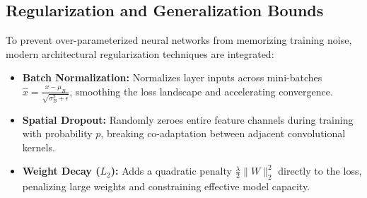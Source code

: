 \subsection{Regularization and Generalization Bounds}
To prevent over-parameterized neural networks from memorizing training noise, modern architectural regularization techniques are integrated:
\begin{itemize}
  \item \textbf{Batch Normalization:} Normalizes layer inputs across mini-batches $\hat{x} = \frac{x - \mu_B}{\sqrt{\sigma_B^2 + \epsilon}}$, smoothing the loss landscape and accelerating convergence.
  \item \textbf{Spatial Dropout:} Randomly zeroes entire feature channels during training with probability $p$, breaking co-adaptation between adjacent convolutional kernels.
  \item \textbf{Weight Decay ($L_2$):} Adds a quadratic penalty $\frac{\lambda}{2} \|W\|_2^2$ directly to the loss, penalizing large weights and constraining effective model capacity.
\end{itemize}
